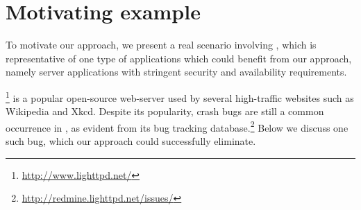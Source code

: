 \section{Motivating example}
\label{sec:example}



To motivate our approach, we present a real scenario involving
\lighttpd, which is representative of one type of applications which
could benefit from our approach, namely server applications with
stringent security and availability requirements.


\lighttpd\footnote{\url{http://www.lighttpd.net/}} is a popular open-source 
web-server used 
by several high-traffic websites such as Wikipedia and Xkcd.
Despite its popularity, crash bugs are still a common
occurrence in \lighttpd, as evident from its bug tracking
database.\footnote{\url{http://redmine.lighttpd.net/issues/}}  Below
we discuss one such bug, which our approach could successfully
eliminate.


